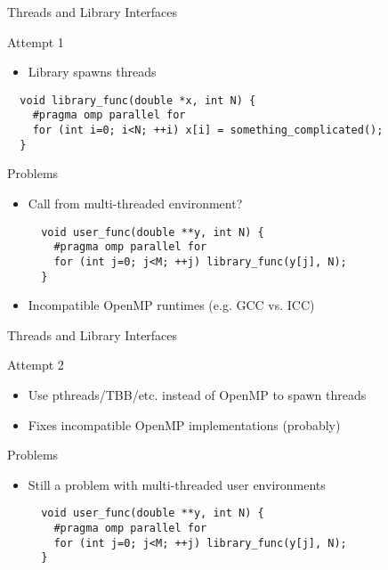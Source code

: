 

\begin{frame}[fragile]{Threads and Library Interfaces}

 \begin{block}{Attempt 1}
  \begin{itemize}
   \item Library spawns threads
  \end{itemize}
 \end{block}

   \begin{lstlisting}
  void library_func(double *x, int N) {
    #pragma omp parallel for
    for (int i=0; i<N; ++i) x[i] = something_complicated();
  }
  \end{lstlisting}

  
  \begin{block}{Problems}
   \begin{itemize}
    \item Call from multi-threaded environment?
   \begin{lstlisting}
  void user_func(double **y, int N) {
    #pragma omp parallel for
    for (int j=0; j<M; ++j) library_func(y[j], N);
  }
  \end{lstlisting}
    \item Incompatible OpenMP runtimes (e.g. GCC vs. ICC)
   \end{itemize}
 \end{block}

\end{frame}

\begin{frame}[fragile]{Threads and Library Interfaces}

 \begin{block}{Attempt 2}
  \begin{itemize}
   \item Use pthreads/TBB/etc. instead of OpenMP to spawn threads
   \item Fixes incompatible OpenMP implementations (probably)
  \end{itemize}
 \end{block}

  \begin{block}{Problems}
   \begin{itemize}
    \item Still a problem with multi-threaded user environments
   \begin{lstlisting}
  void user_func(double **y, int N) {
    #pragma omp parallel for
    for (int j=0; j<M; ++j) library_func(y[j], N);
  }
   \end{lstlisting}
  \end{itemize}
 \end{block}

\end{frame}


